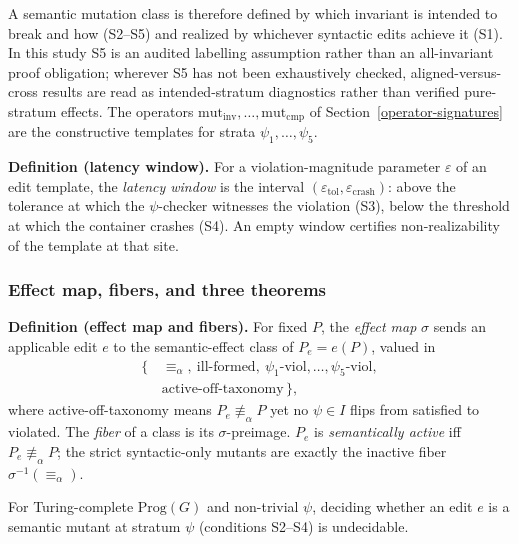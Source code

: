 \documentclass[manuscript,screen,review]{acmart}
\begin{document}
A semantic mutation class is therefore defined by which invariant is
intended to break and how (S2--S5) and realized by whichever syntactic
edits achieve it (S1). In this study S5 is an audited labelling
assumption rather than an all-invariant proof obligation; wherever S5 has
not been exhaustively checked, aligned-versus-cross results are read as
intended-stratum diagnostics rather than verified pure-stratum effects.
The operators $\mathrm{mut}_{\mathrm{inv}}, \dots, \mathrm{mut}_{\mathrm{cmp}}$ of Section~\ref{operator-signatures}
are the constructive templates for strata $\psi_1, \dots, \psi_5$.

\textbf{Definition (latency window).} For a violation-magnitude
parameter $\varepsilon$ of an edit template, the \emph{latency window}
is the interval $(\varepsilon_{\mathrm{tol}}, \varepsilon_{\mathrm{crash}})$:
above the tolerance at which the $\psi$-checker witnesses the violation
(S3), below the threshold at which the container crashes (S4). An empty
window certifies non-realizability of the template at that site.

\subsubsection{Effect map, fibers, and three theorems}\label{theory-fibers}

\textbf{Definition (effect map and fibers).} For fixed $P$, the
\emph{effect map} $\sigma$ sends an applicable edit $e$ to the
semantic-effect class of $P_e = e(P)$, valued in
\[
\begin{aligned}
\{\,&\equiv_\alpha,\ \text{ill-formed},\
      \psi_1\text{-viol}, \dots, \psi_5\text{-viol},\\
   &\text{active-off-taxonomy}\,\},
\end{aligned}
\]
where active-off-taxonomy means $P_e \not\equiv_\alpha P$ yet no
$\psi \in I$ flips from satisfied to violated. The \emph{fiber} of a
class is its $\sigma$-preimage. $P_e$ is \emph{semantically active} iff
$P_e \not\equiv_\alpha P$; the strict syntactic-only mutants are exactly
the inactive fiber $\sigma^{-1}(\equiv_\alpha)$.

\begin{theorem}\label{thm:undecidability}
For
Turing-complete $\mathrm{Prog}(G)$ and non-trivial $\psi$, deciding
whether an edit $e$ is a semantic mutant at stratum $\psi$
(conditions S2--S4) is undecidable.
\end{theorem}
\end{document}
